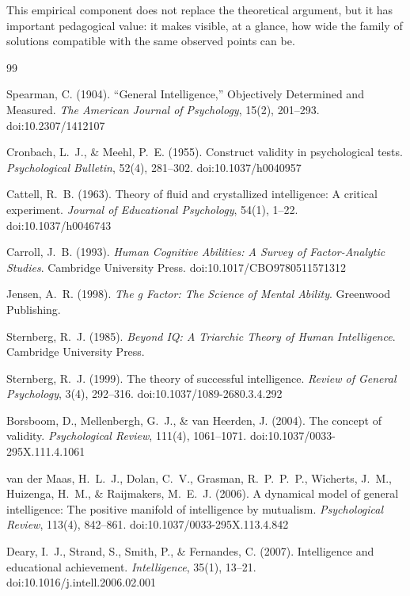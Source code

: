 \documentclass[10pt, a4paper]{article}
\theoremstyle{plain}
\theoremstyle{definition}
\theoremstyle{remark}
\begin{document}
This empirical component does not replace the theoretical argument, but it has
important pedagogical value: it makes visible, at a glance, how wide the family
of solutions compatible with the same observed points can be.

\begin{thebibliography}{99}

Spearman, C. (1904).
``General Intelligence,'' Objectively Determined and Measured.
\textit{The American Journal of Psychology}, 15(2), 201--293.
doi:10.2307/1412107

Cronbach, L.~J., \& Meehl, P.~E. (1955).
Construct validity in psychological tests.
\textit{Psychological Bulletin}, 52(4), 281--302.
doi:10.1037/h0040957

Cattell, R.~B. (1963).
Theory of fluid and crystallized intelligence: A critical experiment.
\textit{Journal of Educational Psychology}, 54(1), 1--22.
doi:10.1037/h0046743

Carroll, J.~B. (1993).
\textit{Human Cognitive Abilities: A Survey of Factor-Analytic Studies}.
Cambridge University Press.
doi:10.1017/CBO9780511571312

Jensen, A.~R. (1998).
\textit{The g Factor: The Science of Mental Ability}.
Greenwood Publishing.

Sternberg, R.~J. (1985).
\textit{Beyond IQ: A Triarchic Theory of Human Intelligence}.
Cambridge University Press.

Sternberg, R.~J. (1999).
The theory of successful intelligence.
\textit{Review of General Psychology}, 3(4), 292--316.
doi:10.1037/1089-2680.3.4.292

Borsboom, D., Mellenbergh, G.~J., \& van Heerden, J. (2004).
The concept of validity.
\textit{Psychological Review}, 111(4), 1061--1071.
doi:10.1037/0033-295X.111.4.1061

van der Maas, H.~L.~J., Dolan, C.~V., Grasman, R.~P.~P.~P., Wicherts, J.~M.,
Huizenga, H.~M., \& Raijmakers, M.~E.~J. (2006).
A dynamical model of general intelligence: The positive manifold of intelligence
by mutualism.
\textit{Psychological Review}, 113(4), 842--861.
doi:10.1037/0033-295X.113.4.842

Deary, I.~J., Strand, S., Smith, P., \& Fernandes, C. (2007).
Intelligence and educational achievement.
\textit{Intelligence}, 35(1), 13--21.
doi:10.1016/j.intell.2006.02.001


\end{thebibliography}
\end{document}
